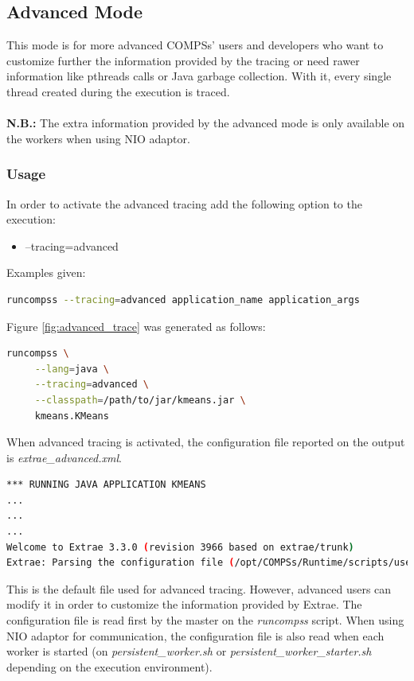 \subsection{Advanced Mode}
This mode is for more advanced COMPSs' users and developers who want to customize further the information provided by the tracing or need rawer information like pthreads calls or Java garbage collection. With it, every single thread created during the execution is traced.
\\
\\
\textbf{N.B.:} The extra information provided by the advanced mode is only available on the workers when using NIO adaptor.


\subsubsection{Usage}

In order to activate the advanced tracing add the following option to the execution:

\begin{itemize}
 \item --tracing=advanced
\end{itemize}

\noindent Examples given:

\begin{lstlisting}[language=bash]
runcompss --tracing=advanced application_name application_args
\end{lstlisting}

\noindent Figure \ref{fig:advanced_trace} was generated as follows:


\begin{lstlisting}[language=bash]
runcompss \
     --lang=java \
     --tracing=advanced \
     --classpath=/path/to/jar/kmeans.jar \
     kmeans.KMeans
\end{lstlisting}


When advanced tracing is activated, the configuration file reported on the output is \textit{extrae\_advanced.xml}. 

\begin{lstlisting}[language=bash]
*** RUNNING JAVA APPLICATION KMEANS
...
...
...
Welcome to Extrae 3.3.0 (revision 3966 based on extrae/trunk)
Extrae: Parsing the configuration file (/opt/COMPSs/Runtime/scripts/user/../../configuration/xml/tracing/extrae_advanced.xml) begins
\end{lstlisting}

This is the default file used for advanced tracing. However, advanced users can modify it in order to customize the information provided by Extrae. The configuration file is read first by the master on the \textit{runcompss} script. When using NIO adaptor for communication, the configuration file is also read when each worker is started (on \textit{persistent\_worker.sh} or \textit{persistent\_worker\_starter.sh} depending on the execution environment).

